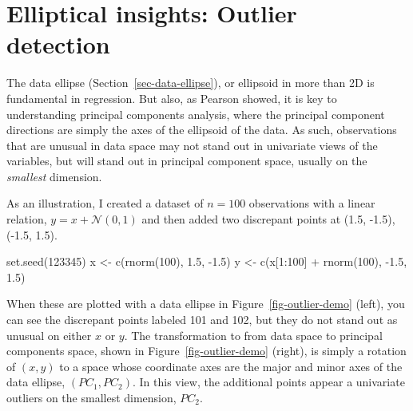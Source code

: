 \documentclass[
  letterpaper,
  10pt,
  krantz2]{krantz}
\makeatletter
\newenvironment{Shaded}{\begin{snugshade}}{\end{snugshade}}
\newcommand{\DecValTok}[1]{\textcolor[rgb]{0.68,0.00,0.00}{#1}}
\newcommand{\FloatTok}[1]{\textcolor[rgb]{0.68,0.00,0.00}{#1}}
\newcommand{\FunctionTok}[1]{\textcolor[rgb]{0.28,0.35,0.67}{#1}}
\newcommand{\NormalTok}[1]{\textcolor[rgb]{0.00,0.23,0.31}{#1}}
\newcommand{\OtherTok}[1]{\textcolor[rgb]{0.00,0.23,0.31}{#1}}
\newcommand{\SpecialCharTok}[1]{\textcolor[rgb]{0.37,0.37,0.37}{#1}}
\newenvironment{kframe}{%
  \medskip{}
  \setlength{\fboxsep}{.8em}
  \def\at@end@of@kframe{}%
  \ifinner\ifhmode%
  \def\at@end@of@kframe{\end{minipage}}%
  \begin{minipage}{\columnwidth}%
  \fi\fi%
  \def\FrameCommand##1{\hskip\@totalleftmargin \hskip-\fboxsep
  \colorbox{shadecolor}{##1}\hskip-\fboxsep
      \hskip-\linewidth \hskip-\@totalleftmargin \hskip\columnwidth}%
  \MakeFramed {\advance\hsize-\width
    \@totalleftmargin\z@ \linewidth\hsize
    \@setminipage}}%
{\par\unskip\endMakeFramed%
  \at@end@of@kframe}
\renewenvironment{Shaded}{\begin{kframe}}{\end{kframe}}
\makeatother
\begin{document}
\hypertarget{elliptical-insights-outlier-detection}{%
\section{Elliptical insights: Outlier
detection}\label{elliptical-insights-outlier-detection}}

The data ellipse (Section~\ref{sec-data-ellipse}), or ellipsoid in more
than 2D is fundamental in regression. But also, as Pearson showed, it is
key to understanding principal components analysis, where the principal
component directions are simply the axes of the ellipsoid of the data.
As such, observations that are unusual in data space may not stand out
in univariate views of the variables, but will stand out in principal
component space, usually on the \emph{smallest} dimension.

As an illustration, I created a dataset of \(n = 100\) observations with
a linear relation, \(y = x + \mathcal{N}(0, 1)\) and then added two
discrepant points at (1.5, -1.5), (-1.5, 1.5).

\begin{Shaded}
\begin{Highlighting}[]
\FunctionTok{set.seed}\NormalTok{(}\DecValTok{123345}\NormalTok{)}
\NormalTok{x }\OtherTok{\textless{}{-}} \FunctionTok{c}\NormalTok{(}\FunctionTok{rnorm}\NormalTok{(}\DecValTok{100}\NormalTok{),             }\FloatTok{1.5}\NormalTok{, }\SpecialCharTok{{-}}\FloatTok{1.5}\NormalTok{)}
\NormalTok{y }\OtherTok{\textless{}{-}} \FunctionTok{c}\NormalTok{(x[}\DecValTok{1}\SpecialCharTok{:}\DecValTok{100}\NormalTok{] }\SpecialCharTok{+} \FunctionTok{rnorm}\NormalTok{(}\DecValTok{100}\NormalTok{), }\SpecialCharTok{{-}}\FloatTok{1.5}\NormalTok{, }\FloatTok{1.5}\NormalTok{)}
\end{Highlighting}
\end{Shaded}

When these are plotted with a data ellipse in
Figure~\ref{fig-outlier-demo} (left), you can see the discrepant points
labeled 101 and 102, but they do not stand out as unusual on either
\(x\) or \(y\). The transformation to from data space to principal
components space, shown in Figure~\ref{fig-outlier-demo} (right), is
simply a rotation of \((x, y)\) to a space whose coordinate axes are the
major and minor axes of the data ellipse, \((PC_1, PC_2)\). In this
view, the additional points appear a univariate outliers on the smallest
dimension, \(PC_2\).
\end{document}
